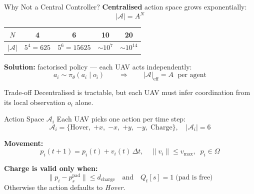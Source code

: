 \documentclass[aspectratio=169,12pt]{beamer}
\begin{document}
\begin{frame}{Why Not a Central Controller?}
\textbf{Centralised} action space grows exponentially:
\[
|\mathcal{A}| = A^N
\]

\vspace{0.3em}
\begin{center}
\begin{tabular}{@{}ccccc@{}}
\toprule
$N$ & 4 & 6 & 10 & 20 \\
\midrule
$|\mathcal{A}|$ & $5^4 = 625$ & $5^6 = 15625$ & $\sim\!10^7$ & $\sim\!10^{14}$ \\
\bottomrule
\end{tabular}
\end{center}

\vspace{0.4em}
\textbf{Solution:} factorised policy --- each UAV acts independently:
\[
a_i \sim \pi_\theta(a_i \mid o_i)
\qquad\Longrightarrow\qquad
|\mathcal{A}|_{\text{eff}} = A \;\text{ per agent}
\]

\vspace{0.3em}
\begin{block}{Trade-off}
Decentralised is tractable, but each UAV must infer coordination from its local observation $o_i$ alone.
\end{block}
\end{frame}

\begin{frame}{Action Space $\mathcal{A}_i$}
Each UAV picks one action per time step:
\[
\mathcal{A}_i = \bigl\{
  \text{Hover},\;
  {+x},\; {-x},\; {+y},\; {-y},\;
  \text{Charge}
\bigr\}, \quad |\mathcal{A}_i| = 6
\]

\vspace{0.5em}
\textbf{Movement:}
\[
p_i(t+1) = p_i(t) + v_i(t)\,\Delta t,
\quad \|v_i\| \le v_{\max},\;\; p_i \in \Omega
\]

\vspace{0.3em}
\textbf{Charge is valid only when:}
\[
\|p_i - p_s^{\text{pad}}\| \le d_{\text{charge}}
\quad\text{and}\quad
Q_t[s] = 1 \;\text{(pad is free)}
\]
Otherwise the action defaults to \emph{Hover}.
\end{frame}
\end{document}
